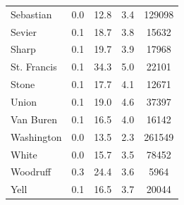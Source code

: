 \begin{table}
\begin{tabular}{lcccc}
Sebastian & 0.0 & 12.8 & 3.4 & 129098 \\
Sevier & 0.1 & 18.7 & 3.8 & 15632 \\
Sharp & 0.1 & 19.7 & 3.9 & 17968 \\
St. Francis & 0.1 & 34.3 & 5.0 & 22101 \\
Stone & 0.1 & 17.7 & 4.1 & 12671 \\
Union & 0.1 & 19.0 & 4.6 & 37397 \\
Van Buren & 0.1 & 16.5 & 4.0 & 16142 \\
Washington & 0.0 & 13.5 & 2.3 & 261549 \\
White & 0.0 & 15.7 & 3.5 & 78452 \\
Woodruff & 0.3 & 24.4 & 3.6 & 5964 \\
Yell & 0.1 & 16.5 & 3.7 & 20044 \\
\bottomrule
\end{tabular}
\end{table}
